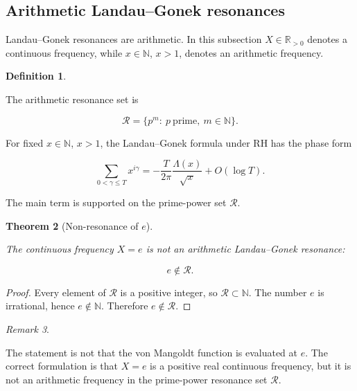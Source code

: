 \documentclass[11pt]{amsart}
\numberwithin{equation}{section}
\theoremstyle{plain}
\newtheorem{theorem}{Theorem}[section]
\theoremstyle{definition}
\newtheorem{definition}[theorem]{Definition}
\theoremstyle{remark}
\newtheorem{remark}[theorem]{Remark}
\begin{document}
\subsection{Arithmetic Landau--Gonek resonances}
\label{subsec:arithmetic_landau_gonek_resonances}

Landau--Gonek resonances are arithmetic. In this subsection
\(X\in\mathbb{R}_{>0}\) denotes a continuous frequency, while
\(x\in\mathbb{N}\), \(x>1\), denotes an arithmetic frequency.

\begin{definition}
\label{def:prime_power_resonance_set}

The arithmetic resonance set is

\begin{equation}
\mathcal R
=
\{p^m:\ p\ \text{prime},\ m\in\mathbb N\}.
\label{eq:prime_power_resonance_set}
\end{equation}

\end{definition}

For fixed \(x\in\mathbb N\), \(x>1\), the Landau--Gonek formula under RH
has the phase form

\begin{equation}
\sum_{0<\gamma\leq T}x^{i\gamma}
=
-
\frac{T}{2\pi}
\frac{\Lambda(x)}{\sqrt{x}}
+
O(\log T).
\label{eq:landau_gonek_new_section_phase_form}
\end{equation}

The main term is supported on the prime-power set \(\mathcal R\).

\begin{theorem}[Non-resonance of \(e\)]
\label{thm:e_non_resonant}

The continuous frequency \(X=e\) is not an arithmetic Landau--Gonek
resonance:

\begin{equation}
e\notin\mathcal R.
\label{eq:e_not_in_resonance_set}
\end{equation}

\end{theorem}

\begin{proof}
Every element of \(\mathcal R\) is a positive integer, so
\(\mathcal R\subset\mathbb N\). The number \(e\) is irrational, hence
\(e\notin\mathbb N\). Therefore \(e\notin\mathcal R\).
\end{proof}

\begin{remark}
\label{rem:no_mangoldt_at_e}

The statement is not that the von Mangoldt function is evaluated at
\(e\). The correct formulation is that \(X=e\) is a positive real
continuous frequency, but it is not an arithmetic frequency in the
prime-power resonance set \(\mathcal R\).
\end{remark}
\end{document}
